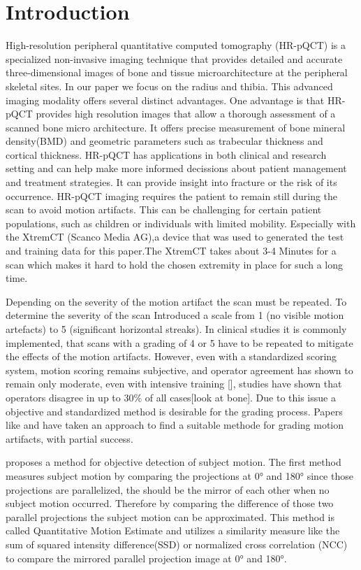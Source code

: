 \documentclass[
a4paper, 
12pt,
grayscalebody, %
abstract=on,
twoside, BCOR10mm, 12pt, DIV13,headinclude, footexclude, final, abstracton, openright
]{ibireprt}
\numberwithin{equation}{chapter}
\numberwithin{table}{chapter}
\numberwithin{figure}{chapter}
\numberwithin{algorithm}{chapter}
\numberwithin{example}{chapter}
\numberwithin{example}{chapter}
\begin{document}
\chapter{Introduction}

High-resolution peripheral quantitative computed tomography (HR-pQCT) is a specialized non-invasive imaging technique that provides detailed and accurate three-dimensional images of bone and tissue microarchitecture at the peripheral skeletal sites. In our paper we focus  on the radius and thibia. This advanced imaging modality offers several distinct advantages. One advantage is that HR-pQCT provides high resolution images that allow a thorough assessment of a scanned bone micro architecture. It offers precise measurement of bone mineral density(BMD) and geometric parameters such as trabecular thickness and cortical thickness. HR-pQCT has applications in both clinical and research setting and can help make more informed decissions about patient management and treatment strategies. It can provide insight into fracture or the risk of its occurrence. HR-pQCT imaging requires the patient to remain still during the scan to avoid motion artifacts. This can be challenging for certain patient populations, such as children or individuals with limited  mobility. Especially with the XtremCT (Scanco Media AG),a device that  was used to generated the test and training data for this paper.The XtremCT takes about 3-4 Minutes for a scan which makes it hard to hold the chosen extremity in place for such a long time.

 Depending on the severity of the motion artifact the scan must be repeated. To determine the severity of the scan \cite{Whittier2020} Introduced a scale from 1 (no visible motion artefacts) to 5 (significant horizontal streaks). In clinical studies it is commonly implemented, that scans with a grading of 4 or 5 have to be repeated to mitigate the effects of the motion artifacts. However, even with a standardized scoring system, motion scoring remains subjective, and operator agreement has shown to remain only moderate, even with intensive training [], studies have shown that operators disagree in up to 30\% of all cases[look at bone]. Due to this issue a objective and standardized method is desirable for the grading process. Papers like \cite{Sode2011} and \cite{Walle2023} have taken an approach to find a suitable methode for grading motion artifacts, with partial success.
 
\cite{Walle2023} proposes a method for objective detection of subject motion. The first method measures subject motion by comparing the projections at 0° and 180° since those projections are parallelized, the should be the mirror of each other when no subject motion occurred. Therefore by comparing the difference of those two parallel projections the subject motion can be approximated. This method is called Quantitative Motion Estimate and utilizes a similarity measure like the sum of squared intensity difference(SSD) or normalized cross correlation (NCC) to compare the mirrored parallel projection image at 0° and 180°.%
\end{document}
